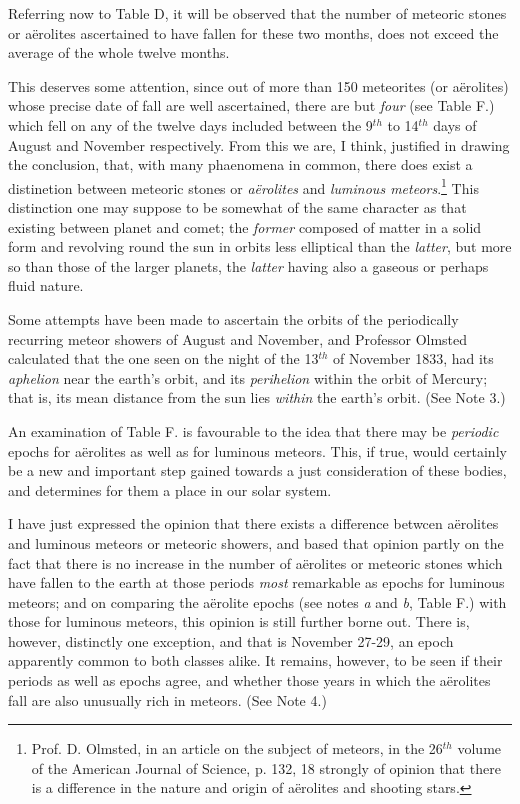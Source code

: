 \documentclass[a4paper, 12pt, oneside]{article}
\begin{document}
Referring now to Table D, it will be observed that the number of meteoric stones or aërolites ascertained to have fallen for these two months, does not exceed the average of the whole twelve months.

This deserves some attention, since out of more than 150 meteorites (or aërolites) whose precise date of fall are well ascertained, there are but \emph{four} (see Table F.) which fell on any of the twelve days included between the 9$^{th}$ to 14$^{th}$ days of August and November respectively. From this we are, I think, justified in drawing the conclusion, that, with many phaenomena in common, there does exist a distinetion between meteoric stones or \emph{aërolites} and \emph{luminous meteors}.\footnote{Prof. D. Olmsted, in an article on the subject of meteors, in the 26$^{th}$ volume of the American Journal of Science, p. 132, 18 strongly of opinion that there is a difference in the nature and origin of aërolites and shooting stars.} This distinction one may suppose to be somewhat of the same character as that existing between planet and comet; the \emph{former} composed of matter in a solid form and revolving round the sun in orbits less elliptical than the \emph{latter}, but more so than those of the larger planets, the \emph{latter} having also a gaseous or perhaps fluid nature.

Some attempts have been made to ascertain the orbits of the periodically recurring meteor showers of August and November, and Professor Olmsted calculated that the one seen on the night of the 13$^{th}$ of November 1833, had its \emph{aphelion} near the earth's orbit, and its \emph{perihelion} within the orbit of Mercury; that is, its mean distance from the sun lies \emph{within} the earth's orbit. (See Note 3.)

An examination of Table F. is favourable to the idea that there may be \emph{periodic} epochs for aërolites as well as for luminous meteors. This, if true, would certainly be a new and important step gained towards a just consideration of these bodies, and determines for them a place in our solar system.

I have just expressed the opinion that there exists a difference betwcen aërolites and luminous meteors or meteoric showers, and based that opinion partly on the fact that there is no increase in the number of aërolites or meteoric stones which have fallen to the earth at those periods \emph{most} remarkable as epochs for luminous meteors; and on comparing the aërolite epochs (see notes \emph{a} and \emph{b}, Table F.) with those for luminous meteors, this opinion is still further borne out. There is, however, distinctly one exception, and that is November 27-29, an epoch apparently common to both classes alike. It remains, however, to be seen if their periods as well as epochs agree, and whether those years in which the aërolites fall are also unusually rich in meteors. (See Note 4.)
\end{document}
